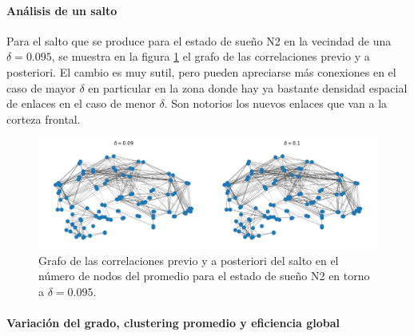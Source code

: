 \documentclass{article}
\begin{document}
\paragraph{Análisis de un salto}
%

Para el salto que se produce para el estado de sueño N2 en la vecindad de una $\delta = 0.095$, se muestra en la figura \ref{fg:grafoSaltoN2} el grafo de las correlaciones previo y a posteriori.
El cambio es muy sutil, pero pueden apreciarse más conexiones en el caso de mayor $\delta$ en particular en la zona donde hay ya bastante densidad espacial de enlaces en el caso de menor $\delta$.
Son notorios los nuevos enlaces que van a la corteza frontal.

\begin{figure}[ht]
	\centering
	\includegraphics[width= \linewidth]{grafoSaltoN2.png}
	\caption{Grafo de las correlaciones previo y a posteriori del salto en el número de nodos del promedio para el estado de sueño N2 en torno a $\delta = 0.095$.
	}
	\label{fg:grafoSaltoN2}
\end{figure}


\paragraph*{Variación del grado, clustering promedio y eficiencia global}
\end{document}

